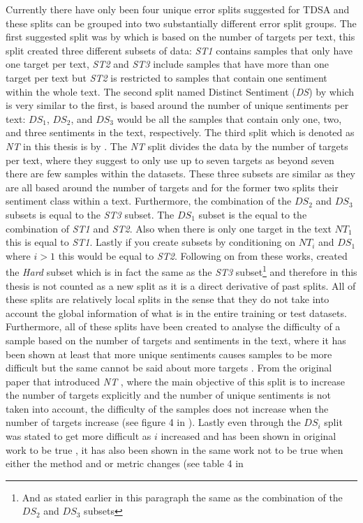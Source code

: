 Currently there have only been four unique error splits suggested for TDSA and these splits can be grouped into two substantially different error split groups. The first suggested split was by \citet{aug_nguyen-shirai-2015-phrasernn} which is based on the number of targets per text, this split created three different subsets of data: \textit{ST1} contains samples that only have one target per text, \textit{ST2} and \textit{ST3} include samples that have more than one target per text but \textit{ST2} is restricted to samples that contain one sentiment within the whole text. The second split named Distinct Sentiment (\textit{DS}) by \citet{aug_wang-etal-2017-tdparse} which is very similar to the first, is based around the number of unique sentiments per text: $DS_1$, $DS_2$, and $DS_3$ would be all the samples that contain only one, two, and three sentiments in the text, respectively. The third split which is denoted as \textit{NT} in this thesis is by \citet{aug_zhang2019aspectbased}. The \textit{NT} split divides the data by the number of targets per text, where they suggest to only use up to seven targets as beyond seven there are few samples within the datasets. These three subsets are similar as they are all based around the number of targets and for the former two splits their sentiment class within a text. Furthermore, the combination of the $DS_2$ and $DS_3$ subsets is equal to the \textit{ST3} subset. The $DS_1$ subset is the equal to the combination of \textit{ST1} and \textit{ST2}. Also when there is only one target in the text $NT_1$ this is equal to \textit{ST1}. Lastly if you create subsets by conditioning on $NT_i$ and $DS_1$ where $i>1$ this would be equal to \textit{ST2}. Following on from these works, \citet{aug_xue-li-2018-aspect} created the \textit{Hard} subset which is in fact the same as the \textit{ST3} subset\footnote{And as stated earlier in this paragraph the same as the combination of the $DS_2$ and $DS_3$ subsets} and therefore in this thesis is not counted as a new split as it is a direct derivative of past splits. All of these splits are relatively local splits in the sense that they do not take into account the global information of what is in the entire training or test datasets. Furthermore, all of these splits have been created to analyse the difficulty of a sample based on the number of targets and sentiments in the text, where it has been shown at least that more unique sentiments causes samples to be more difficult \citep{aug_wang-etal-2017-tdparse,aug_nguyen-shirai-2015-phrasernn} but the same cannot be said about more targets \citep{aug_zhang2019aspectbased,aug_nguyen-shirai-2015-phrasernn}. From the original paper that introduced \textit{NT} \citep{aug_zhang2019aspectbased}, where the main objective of this split is to increase the number of targets explicitly and the number of unique sentiments is not taken into account, the difficulty of the samples does not increase when the number of targets increase (see figure 4 in \citet{aug_zhang2019aspectbased}).  Lastly even through the $DS_i$ split was stated to get more difficult as $i$ increased and has been shown in original work to be true \citep{aug_wang-etal-2017-tdparse}, it has also been shown in the same work not to be true when either the method and or metric changes (see table 4 in 